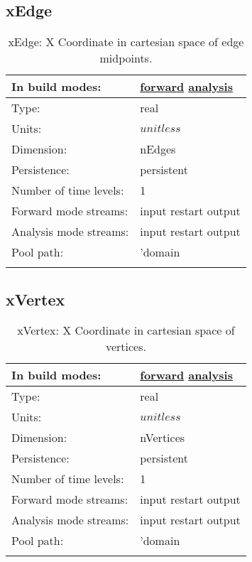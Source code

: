 \subsection[xEdge]{xEdge}
\label{subsec:var_sec_mesh_xEdge}
\begin{center}
\begin{longtable}{| p{2.0in} | p{4.0in} |}
        \hline 
        In build modes: & \hyperref[subsec:forward_var_tab_mesh]{forward} \hyperref[subsec:analysis_var_tab_mesh]{analysis} \\
        \hline 
        Type: & real \\
        \hline 
        Units: & $unitless$ \\
        \hline 
        Dimension: & nEdges \\
        \hline 
        Persistence: & persistent \\
        \hline 
        Number of time levels: & 1 \\
        \hline 
		 Forward mode streams: &  input restart output \\
        \hline 
		 Analysis mode streams: &  input restart output \\
        \hline 
            Pool path: & 'domain %
 \\
		 \hline 
    \caption{xEdge: X Coordinate in cartesian space of edge midpoints.}
\end{longtable}
\end{center}
\subsection[xVertex]{xVertex}
\label{subsec:var_sec_mesh_xVertex}
\begin{center}
\begin{longtable}{| p{2.0in} | p{4.0in} |}
        \hline 
        In build modes: & \hyperref[subsec:forward_var_tab_mesh]{forward} \hyperref[subsec:analysis_var_tab_mesh]{analysis} \\
        \hline 
        Type: & real \\
        \hline 
        Units: & $unitless$ \\
        \hline 
        Dimension: & nVertices \\
        \hline 
        Persistence: & persistent \\
        \hline 
        Number of time levels: & 1 \\
        \hline 
		 Forward mode streams: &  input restart output \\
        \hline 
		 Analysis mode streams: &  input restart output \\
        \hline 
            Pool path: & 'domain %
 \\
		 \hline 
    \caption{xVertex: X Coordinate in cartesian space of vertices.}
\end{longtable}
\end{center}
